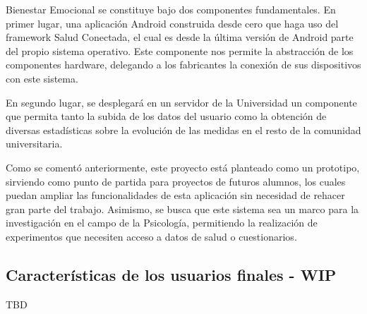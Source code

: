         Bienestar Emocional se constituye bajo dos componentes fundamentales. En primer lugar, una aplicación Android construida desde cero que haga uso del \gls{framework} Salud Conectada, el cual es desde la última versión de Android parte del propio sistema operativo. Este componente nos permite la abstracción de los componentes hardware, delegando a los fabricantes la conexión de sus dispositivos con este sistema.

        En segundo lugar, se desplegará en un servidor de la Universidad un componente que permita tanto la subida de los datos del usuario como la obtención de diversas estadísticas sobre la evolución de las medidas en el resto de la comunidad universitaria.

        Como se comentó anteriormente, este proyecto está planteado como un prototipo, sirviendo como punto de partida para proyectos de futuros alumnos, los cuales puedan ampliar las funcionalidades de esta aplicación sin necesidad de rehacer gran parte del trabajo. Asimismo, se busca que este sistema sea un marco para la investigación en el campo de la Psicología, permitiendo la realización de experimentos que necesiten acceso a datos de salud o cuestionarios.


    \subsection{Características de los usuarios finales - WIP}
        \label{req:descripcion:usuarios}
        
    TBD

    
        
